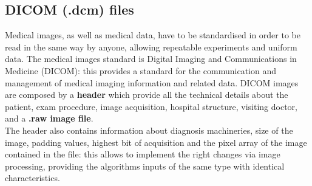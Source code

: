 \documentclass[../main.tex]{subfiles}
\begin{document}
\subsection{DICOM (.dcm) files}
Medical images, as well as medical data, have to be standardised in order to be read in the same way by anyone, allowing repeatable experiments and uniform data. 
The medical images standard is Digital Imaging and Communications in Medicine (DICOM): this provides a standard for the communication and management of medical imaging information and related data.
DICOM images are composed by a \textbf{header} which provide all the technical details about the patient, exam procedure, image acquisition, hospital structure, visiting doctor, and a \textbf{.raw image file}. \\
The header also contains information about diagnosis machineries, size of the image, padding values, highest bit of acquisition and the pixel array of the image contained in the file: this allows to implement the right changes via image processing, providing the algorithms inputs of the same type with identical characteristics.
\vspace{5mm}
\end{document}
